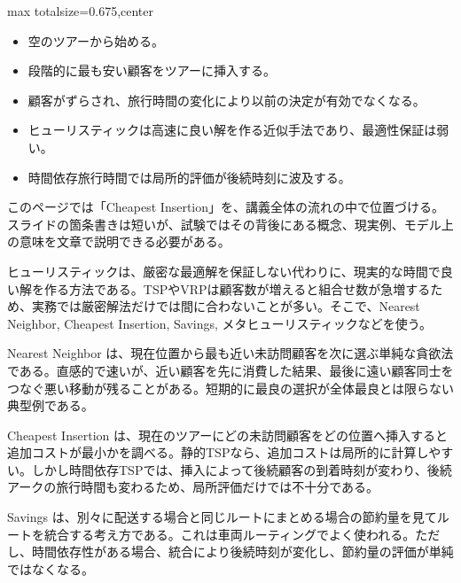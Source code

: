 \clearpage
{}
\begin{adjustbox}{max totalsize={\textwidth}{0.675\textheight},center}
\begin{minipage}{\textwidth}\scriptsize
\begin{minipage}[t]{0.485\textwidth}
\begin{itemize}
\item 空のツアーから始める。
\item 段階的に最も安い顧客をツアーに挿入する。
\item 顧客がずらされ、旅行時間の変化により以前の決定が有効でなくなる。
\end{itemize}
\begin{itemize}
\item ヒューリスティックは高速に良い解を作る近似手法であり、最適性保証は弱い。
\item 時間依存旅行時間では局所的評価が後続時刻に波及する。
\end{itemize}
\end{minipage}\hfill
\begin{minipage}[t]{0.485\textwidth}
このページでは「Cheapest Insertion」を、講義全体の流れの中で位置づける。スライドの箇条書きは短いが、試験ではその背後にある概念、現実例、モデル上の意味を文章で説明できる必要がある。\par
ヒューリスティックは、厳密な最適解を保証しない代わりに、現実的な時間で良い解を作る方法である。TSPやVRPは顧客数が増えると組合せ数が急増するため、実務では厳密解法だけでは間に合わないことが多い。そこで、Nearest Neighbor, Cheapest Insertion, Savings, メタヒューリスティックなどを使う。\par
Nearest Neighbor は、現在位置から最も近い未訪問顧客を次に選ぶ単純な貪欲法である。直感的で速いが、近い顧客を先に消費した結果、最後に遠い顧客同士をつなぐ悪い移動が残ることがある。短期的に最良の選択が全体最良とは限らない典型例である。\par
Cheapest Insertion は、現在のツアーにどの未訪問顧客をどの位置へ挿入すると追加コストが最小かを調べる。静的TSPなら、追加コストは局所的に計算しやすい。しかし時間依存TSPでは、挿入によって後続顧客の到着時刻が変わり、後続アークの旅行時間も変わるため、局所評価だけでは不十分である。\par
Savings は、別々に配送する場合と同じルートにまとめる場合の節約量を見てルートを統合する考え方である。これは車両ルーティングでよく使われる。ただし、時間依存性がある場合、統合により後続時刻が変化し、節約量の評価が単純ではなくなる。\par

\end{minipage}
\end{minipage}
\end{adjustbox}
